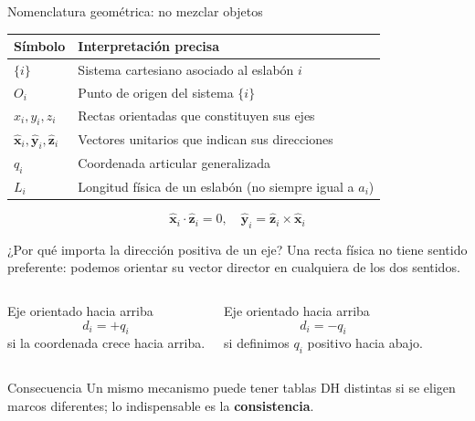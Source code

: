 \documentclass[aspectratio=169,11pt]{beamer}
\begin{document}
\begin{frame}[t]{Nomenclatura geométrica: no mezclar objetos}
 \small
 \begin{tabular}{lp{9.0cm}}
 \toprule
 Símbolo & Interpretación precisa\\\midrule
 $\{i\}$ & Sistema cartesiano asociado al eslabón $i$\\
 $O_i$ & Punto de origen del sistema $\{i\}$\\
 $x_i,y_i,z_i$ & Rectas orientadas que constituyen sus ejes\\
 $\hat{\mathbf x}_i,\hat{\mathbf y}_i,\hat{\mathbf z}_i$
    & Vectores unitarios que indican sus direcciones\\
 $q_i$ & Coordenada articular generalizada\\
 $L_i$ & Longitud física de un eslabón (no siempre igual a $a_i$)\\
 \bottomrule
 \end{tabular}
 \pause
 \[
 \boxed{\hat{\mathbf x}_i\cdot\hat{\mathbf z}_i=0,
 \quad\hat{\mathbf y}_i=\hat{\mathbf z}_i\times\hat{\mathbf x}_i}
 \]
\end{frame}

\begin{frame}[t]{¿Por qué importa la dirección positiva de un eje?}
 \small
 Una recta física no tiene sentido preferente: podemos orientar
 su vector director en cualquiera de los dos sentidos.
 \pause
 \begin{columns}[T,onlytextwidth]
 \begin{block}{Eje orientado hacia arriba}
  \[d_i=+q_i\]
  si la coordenada crece hacia arriba.
 \end{block}
 \begin{block}{Eje orientado hacia arriba}
  \[d_i=-q_i\]
  si definimos $q_i$ positivo hacia abajo.
 \end{block}
 \end{columns}
 \vspace{0.2cm}
 \begin{alertblock}{Consecuencia}
 Un mismo mecanismo puede tener tablas DH distintas si se eligen
 marcos diferentes; lo indispensable es la \textbf{consistencia}.
 \end{alertblock}
\end{frame}
\end{document}
